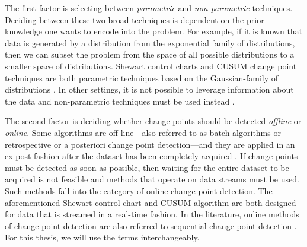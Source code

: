 The first factor is selecting between \textit{parametric} and \textit{non-parametric} techniques. Deciding between these two broad techniques is dependent on the prior knowledge one wants to encode into the problem. For example, if it is known that data is generated by a distribution from the exponential family of distributions, then we can subset the problem from the space of all possible distributions to a smaller space of distributions. Shewart control charts and CUSUM change point techniques are both parametric techniques based on the Gaussian-family of distributions \cite{page1954continuous} \cite{chen2011parametric}. In other settings, it is not possible to leverage information about the data and non-parametric techniques must be used instead \cite{brodsky2013nonparametric}.


The second factor is deciding whether change points should be detected \textit{offline} or \textit{online}. Some algorithms are off-line---also referred to  as batch algorithms or retrospective or a posteriori change point detection---and they are applied in an ex-post fashion after the dataset has been completely acquired \cite{truong2018review}. If change points must be detected as soon as possible, then waiting for the entire dataset to be acquired is not feasible and methods that operate on data streams must be used. Such methods fall into the category of online change point detection. The aforementioned Shewart control chart and CUSUM algorithm are both designed for data that is streamed in a real-time fashion. In the literature, online methods of change point detection are also referred to sequential change point detection  \cite{tartakovsky2014sequential}. For this thesis, we will use the terms interchangeably.%



